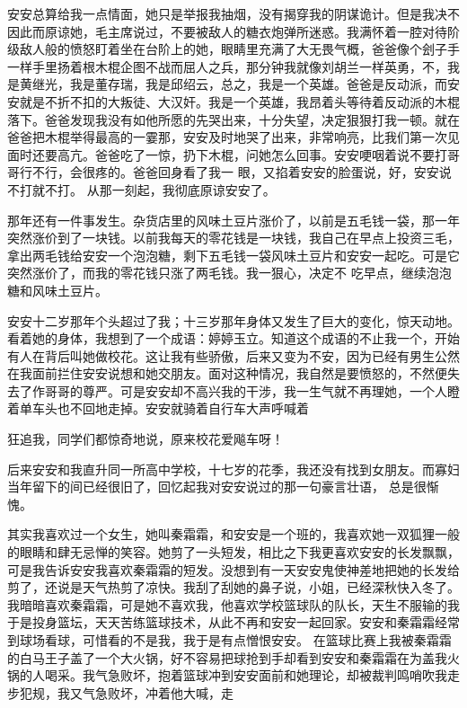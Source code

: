 \documentclass{article}
\begin{document}
安安总算给我一点情面，她只是举报我抽烟，没有揭穿我的阴谋诡计。但是我决不因此而原谅她，毛主席说过，不要被敌人的糖衣炮弹所迷惑。我满怀着一腔对待阶级敌人般的愤怒盯着坐在台阶上的她，眼睛里充满了大无畏气概，爸爸像个刽子手一样手里扬着根木棍企图不战而屈人之兵，那分钟我就像刘胡兰一样英勇，不，我是黄继光，我是董存瑞，我是邱绍云，总之，我是一个英雄。爸爸是反动派，而安安就是不折不扣的大叛徒、大汉奸。我是一个英雄，我昂着头等待着反动派的木棍落下。爸爸发现我没有如他所愿的先哭出来，十分失望，决定狠狠打我一顿。就在爸爸把木棍举得最高的一霎那，安安及时地哭了出来，非常响亮，比我们第一次见面时还要高亢。爸爸吃了一惊，扔下木棍，问她怎么回事。安安哽咽着说不要打哥哥行不行，会很疼的。爸爸回身看了我一
\newpage
眼，又掐着安安的脸蛋说，好，安安说不打就不打。
从那一刻起，我彻底原谅安安了。 

那年还有一件事发生。杂货店里的风味土豆片涨价了，以前是五毛钱一袋，那一年突然涨价到了一块钱。以前我每天的零花钱是一块钱，我自己在早点上投资三毛，拿出两毛钱给安安一个泡泡糖，剩下五毛钱一袋风味土豆片和安安一起吃。可是它突然涨价了，而我的零花钱只涨了两毛钱。我一狠心，决定不
吃早点，继续泡泡糖和风味土豆片。 

安安十二岁那年个头超过了我；十三岁那年身体又发生了巨大的变化，惊天动地。看着她的身体，我想到了一个成语：婷婷玉立。知道这个成语的不止我一个，开始有人在背后叫她做校花。这让我有些骄傲，后来又变为不安，因为已经有男生公然在我面前拦住安安说想和她交朋友。面对这种情况，我自然是要愤怒的，不然便失去了作哥哥的尊严。可是安安却不高兴我的干涉，我一生气就不再理她，一个人瞪着单车头也不回地走掉。安安就骑着自行车大声呼喊着

\newpage
狂追我，同学们都惊奇地说，原来校花爱飚车呀！ 

后来安安和我直升同一所高中学校，十七岁的花季，我还没有找到女朋友。而寡妇当年留下的间已经很旧了，回忆起我对安安说过的那一句豪言壮语，
总是很惭愧。 

其实我喜欢过一个女生，她叫秦霜霜，和安安是一个班的，我喜欢她一双狐狸一般的眼睛和肆无忌惮的笑容。她剪了一头短发，相比之下我更喜欢安安的长发飘飘，可是我告诉安安我喜欢秦霜霜的短发。没想到有一天安安鬼使神差地把她的长发给剪了，还说是天气热剪了凉快。我刮了刮她的鼻子说，小姐，已经深秋快入冬了。我暗暗喜欢秦霜霜，可是她不喜欢我，他喜欢学校篮球队的队长，天生不服输的我于是投身篮坛，天天苦练篮球技术，从此不再和安安一起回家。安安和秦霜霜经常到球场看球，可惜看的不是我，我于是有点憎恨安安。 在篮球比赛上我被秦霜霜的白马王子盖了一个大火锅，好不容易把球抢到手却看到安安和秦霜霜在为盖我火锅的人喝采。我气急败坏，抱着篮球冲到安安面前和她理论，却被裁判鸣哨吹我走步犯规，我又气急败坏，冲着他大喊，走
\newpage
\end{document}
